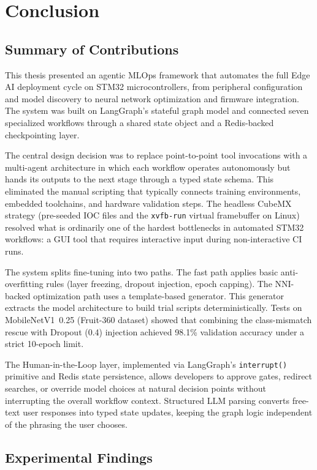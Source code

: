 \chapter{Conclusion}

\section{Summary of Contributions}

This thesis presented an agentic MLOps framework that automates the full Edge AI deployment cycle on STM32 microcontrollers, from peripheral configuration and model discovery to neural network optimization and firmware integration. The system was built on LangGraph's stateful graph model and connected seven specialized workflows through a shared state object and a Redis-backed checkpointing layer.

The central design decision was to replace point-to-point tool invocations with a multi-agent architecture in which each workflow operates autonomously but hands its outputs to the next stage through a typed state schema. This eliminated the manual scripting that typically connects training environments, embedded toolchains, and hardware validation steps. The headless CubeMX strategy (pre-seeded IOC files and the \texttt{xvfb-run} virtual framebuffer on Linux) resolved what is ordinarily one of the hardest bottlenecks in automated STM32 workflows: a GUI tool that requires interactive input during non-interactive CI runs.

The system splits fine-tuning into two paths. The fast path applies basic anti-overfitting rules (layer freezing, dropout injection, epoch capping). The NNI-backed optimization path uses a template-based generator. This generator extracts the model architecture to build trial scripts deterministically. Tests on MobileNetV1~0.25 (Fruit-360 dataset) showed that combining the class-mismatch rescue with Dropout (0.4) injection achieved 98.1\% validation accuracy under a strict 10-epoch limit.

The Human-in-the-Loop layer, implemented via LangGraph's \texttt{interrupt()} primitive and Redis state persistence, allows developers to approve gates, redirect searches, or override model choices at natural decision points without interrupting the overall workflow context. Structured LLM parsing converts free-text user responses into typed state updates, keeping the graph logic independent of the phrasing the user chooses.

\section{Experimental Findings}

